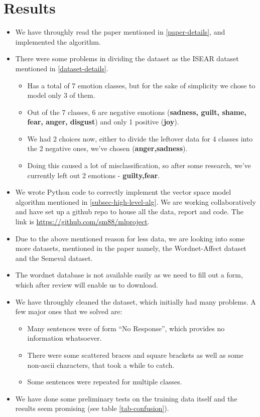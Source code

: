 \section{Results}
\begin{itemize}
 \item We have throughly read the paper mentioned in \ref{paper-details}, and implemented the algorithm.
 \item There were some problems in dividing the dataset as the ISEAR dataset mentioned in \ref{dataset-details}.
 \begin{itemize}
  \item Has a total of 7 emotion classes, but for the sake of simplicity we chose to model only 3 of them.
  \item Out of the 7 classes, 6 are negative emotions (\textbf{sadness, guilt, shame, fear, anger, disgust}) and only 1 positive (\textbf{joy}).
  \item We had 2 choices now, either to divide the leftover data for 4 classes into the 2 negative ones, we've chosen (\textbf{anger,sadness}).
  \item Doing this caused a lot of misclassification, so after some research, we've currently left out 2 emotions - \textbf{guilty,fear}.
 \end{itemize}
 \item We wrote Python code to correctly implement the vector space model algorithm mentioned in \ref{subsec-high-level-alg}. We are working collaboratively and have set up a github repo to house all the data, report and code. The link is \url{https://github.com/sm88/mlproject}.
 \item Due to the above mentioned reason for less data, we are looking into some more datasets, mentioned in the paper namely, the Wordnet-Affect dataset and the Semeval dataset.
 \item The wordnet database is not available easily as we need to fill out a form, which after review will enable us to download.
 \item We have throughly cleaned the dataset, which initially had many problems. A few major ones that we solved are:
 \begin{itemize}
  \item Many sentences were of form ``No Response'', which provides no information whatsoever.
  \item There were some scattered braces and square brackets as well as some non-ascii characters, that took a while to catch.
  \item Some sentences were repeated for multiple classes.
 \end{itemize}
 \item We have done some preliminary tests on the training data itself and the results seem promising (see table \ref{tab-confusion}).
\end{itemize}
